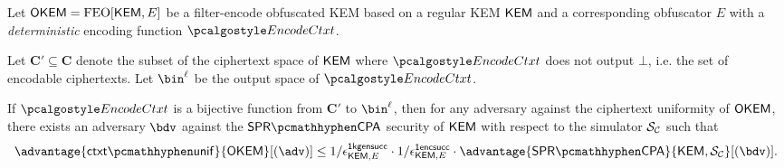\begin{lemma}
\label{lem:ctxt-unif-for-bijections}
    Let $\mathsf{OKEM} = \textsf{\textnormal{FEO}}[\mathsf{KEM}, E]$ be a filter-encode obfuscated KEM based on a regular KEM $\mathsf{KEM}$ and a corresponding obfuscator $E$ with a \emph{deterministic} encoding function $\encodectxt$.

    Let $\mathbf{C}' \subseteq \mathbf{C}$ denote the subset of the ciphertext space of $\mathsf{KEM}$ where $\encodectxt$ does not output $\bot$, i.e. the set of encodable ciphertexts.
    Let $\bin^\ell$ be the output space of $\encodectxt$.

    If $\encodectxt$ is a bijective function from $\mathbf{C}'$ to $\bin^\ell$, then for any adversary against the ciphertext uniformity of $\mathsf{OKEM}$, there exists an adversary $\bdv$ against the $\sprcpa$ security of $\mathsf{KEM}$ with respect to the simulator $\mathcal{S}_\mathcal{C}$ such that
    \[
        \advantage{\ctxtunif}{\OKEM}[(\adv)]
        \leq 1/\epsilon^\firstkeygensuccess_{\KEM,E}
        \cdot 1/\epsilon^\firstencapssuccess_{\KEM,E}
        \cdot \advantage{\sprcpa}{\KEM,\simulunif}[(\bdv)].
    \]
\end{lemma}
